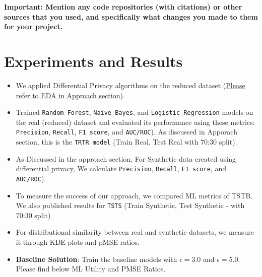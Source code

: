 \documentclass[10pt,twocolumn,letterpaper]{article}
\begin{document}
\textbf{Important: Mention any code repositories (with citations) or other sources that you used, and specifically what changes you made to them for your project. }

\section{Experiments and Results}

\begin{itemize}
    \item We applied Differential Privacy algorithms on the reduced dataset (\hyperref[sec:Approach_EDA]{Please refer to EDA in Approach section}).

    \item Trained \verb'Random Forest', \verb'Naive Bayes', and \verb'Logistic Regression' models on the real (reduced) dataset and evaluated its performance using these metrics: \verb'Precision', \verb'Recall', \verb'F1 score', and \verb'AUC/ROC'). As discussed in Apporach section, this is the \verb'TRTR model' (Train Real, Test Real with 70:30 split).

    \item As Discussed in the approach section, For Synthetic data created using differential privacy,  We calculate \verb'Precision', \verb'Recall', \verb'F1 score', and \verb'AUC/ROC').

    \item To measure the success of our approach, we compared ML metrics of TSTR. We also published results for \verb'TSTS' (Train Synthetic, Test Synthetic - with 70:30 split)

    \item For distributional similarity between real and synthetic datasets, we measure it through KDE plots and pMSE ratios.

    \item \textbf{Baseline Solution}: Train the baseline models with $\epsilon=3.0$ and $\epsilon=5.0$. Please find below ML Utility and PMSE Ratios.


\end{itemize}
\end{document}
